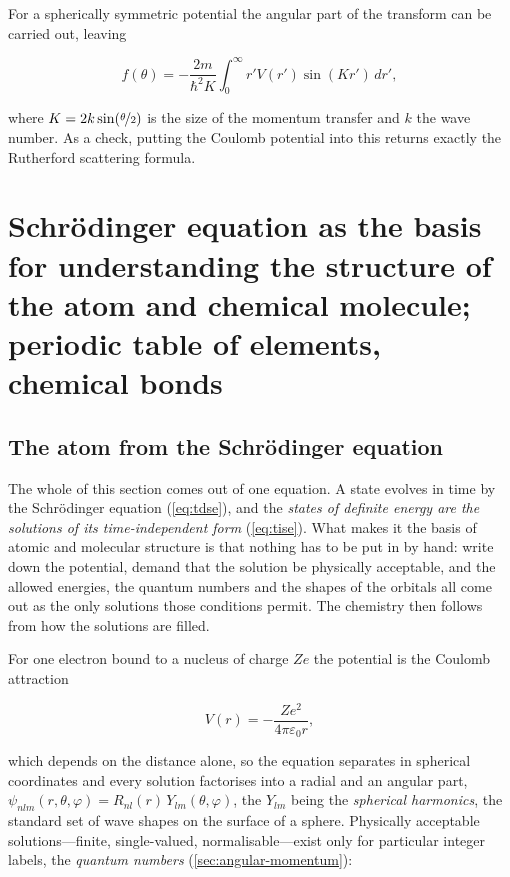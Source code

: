         For a spherically symmetric potential the angular part of the transform can be carried out, leaving

        \begin{equation}\label{eq:born}
            f(\theta) = -\frac{2m}{\hbar^2 K}\int_0^\infty r'V(r')\sin(Kr')\,dr',
        \end{equation}

        where $K = 2k\sin(\nicefrac{\theta}{2})$ is the size of the momentum transfer and $k$ the wave number. As a check, putting the Coulomb potential into this returns exactly the Rutherford scattering formula.

\section{Schrödinger equation as the basis for understanding the structure of the atom and chemical molecule; periodic table of elements, chemical bonds}
\label{sec:atom-molecule}

    \subsection{The atom from the Schrödinger equation}

        The whole of this section comes out of one equation. A state evolves in time by the Schrödinger equation (\cref{eq:tdse}), and the \emph{states of definite energy are the solutions of its time-independent form} (\cref{eq:tise}). What makes it the basis of atomic and molecular structure is that nothing has to be put in by hand: write down the potential, demand that the solution be physically acceptable, and the allowed energies, the quantum numbers and the shapes of the orbitals all come out as the only solutions those conditions permit. The chemistry then follows from how the solutions are filled.

        For one electron bound to a nucleus of charge $Ze$ the potential is the Coulomb attraction

        \begin{equation*}
            V(r) = -\frac{Ze^{2}}{4\pi\varepsilon_{0}r},
        \end{equation*}

        which depends on the distance alone, so the equation separates in spherical coordinates and every solution factorises into a radial and an angular part, $\psi_{nlm}(r,\theta,\varphi) = R_{nl}(r)\,Y_{lm}(\theta,\varphi)$, the $Y_{lm}$ being the \emph{spherical harmonics}, the standard set of wave shapes on the surface of a sphere. Physically acceptable solutions---finite, single-valued, normalisable---exist only for particular integer labels, the \emph{quantum numbers} (\cref{sec:angular-momentum}):

